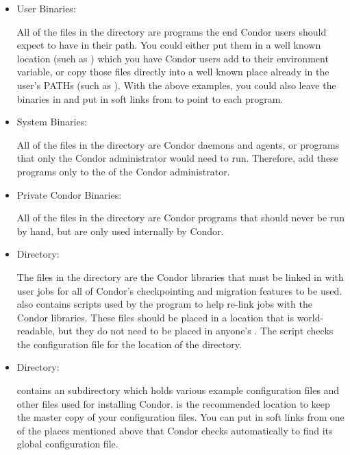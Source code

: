 \begin{description}
\begin{description}
\begin{itemize}
     \item User Binaries:

     All of the files in the  directory are programs the end
     Condor users should expect to have in their path.  You could
     either put them in a well known location (such as
     ) which you have Condor users add to
     their  environment variable, or copy those files
     directly into a well known place already in the user's PATHs (such as
     ).  With the above examples, you could also
     leave the binaries in  and put in
     soft links from  to point to each program.

     \item System Binaries:

     All of the files in the  directory are Condor daemons and
     agents, or programs that only the Condor administrator would need
     to run.  Therefore, add these programs only
     to the  of the Condor administrator.

     \item Private Condor Binaries:

     All of the files in the  directory are Condor
     programs that should never be run by hand, but are only used
     internally by Condor. 

     \item {} Directory:

     The files in the  directory are the Condor libraries that
     must be linked in with user jobs for all of Condor's
     checkpointing and migration features to be used.   also
     contains scripts used by the  program to help
     re-link jobs with the Condor libraries.  These files should be
     placed in a location that is world-readable, but they do not need
     to be placed in anyone's .  The  script checks
     the configuration file for the location of the  directory.

     \item {} Directory:

      contains an  subdirectory which holds various
     example configuration files and other files used for installing Condor.
      is the recommended location to keep the master copy of your
     configuration files.  You can put in soft links from one of the places
     mentioned above that Condor checks automatically to find its
     global configuration file. 
\end{itemize}


\end{description}
\end{description}
